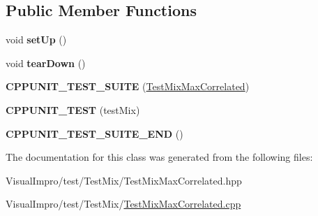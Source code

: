 \subsection*{Public Member Functions}
\begin{DoxyCompactItemize}
\item 
\mbox{\label{class_test_mix_max_correlated_ad471d303145ed21729d97865affc006d}} 
void {\bfseries set\+Up} ()
\item 
\mbox{\label{class_test_mix_max_correlated_a3140c7dbdd4687eb9e3f89b1dc87d06b}} 
void {\bfseries tear\+Down} ()
\item 
\mbox{\label{class_test_mix_max_correlated_a16598a16fb9468e73efe012571bd2733}} 
{\bfseries C\+P\+P\+U\+N\+I\+T\+\_\+\+T\+E\+S\+T\+\_\+\+S\+U\+I\+TE} (\mbox{\hyperlink{class_test_mix_max_correlated}{Test\+Mix\+Max\+Correlated}})
\item 
\mbox{\label{class_test_mix_max_correlated_a56044827894b3ab97b220247720e1412}} 
{\bfseries C\+P\+P\+U\+N\+I\+T\+\_\+\+T\+E\+ST} (test\+Mix)
\item 
\mbox{\label{class_test_mix_max_correlated_ab3d031ac9761a78a0b1f224a1c690d16}} 
{\bfseries C\+P\+P\+U\+N\+I\+T\+\_\+\+T\+E\+S\+T\+\_\+\+S\+U\+I\+T\+E\+\_\+\+E\+ND} ()
\end{DoxyCompactItemize}


The documentation for this class was generated from the following files\+:\begin{DoxyCompactItemize}
\item 
Visual\+Impro/test/\+Test\+Mix/Test\+Mix\+Max\+Correlated.\+hpp\item 
Visual\+Impro/test/\+Test\+Mix/\mbox{\hyperlink{_test_mix_max_correlated_8cpp}{Test\+Mix\+Max\+Correlated.\+cpp}}\end{DoxyCompactItemize}
